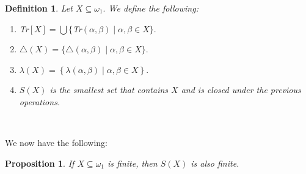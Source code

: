 \documentclass{article}
\newtheorem{definition}[theorem]{Definition}
\newtheorem{proposition}[theorem]{Proposition}
\begin{document}
\begin{definition}
Let $X\subseteq\omega_{1}.$ We define the following:
\label{Def estructura generada}

\begin{enumerate}
\item \textsf{Tr}$\left[  X\right]  =\bigcup\{$\textsf{Tr}$(\alpha,\beta
)\mid\alpha,\beta\in X\}.$

\item $\triangle\left(  X\right)  =\{\triangle\left(  \alpha,\beta\right)
\mid\alpha,\beta\in X\}.$

\item $\lambda\left(  X\right)  =\left\{  \lambda\left(  \alpha,\beta\right)
\mid\alpha,\beta\in X\right\}  .$

\item $S\left(  X\right)  $ is the smallest set that contains $X$ and is
closed under the previous operations.
\end{enumerate}
\end{definition}

\qquad\ \qquad\ \qquad\ 

We now have the following:

\begin{proposition}
If $X\subseteq\omega_{1}$ is finite, then $S\left(  X\right)  $ is also finite.
\end{proposition}
\end{document}
